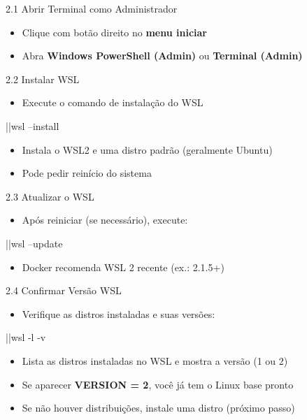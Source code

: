 \begin{frame}{2.1 Abrir Terminal como Administrador}
\begin{itemize}
  \item Clique com botão direito no \textbf{menu iniciar}
  \item Abra \textbf{Windows PowerShell (Admin)} ou \textbf{Terminal (Admin)}
\end{itemize}
\end{frame}

\begin{frame}[fragile]{2.2 Instalar WSL}
\begin{itemize}
  \item Execute o comando de instalação do WSL
\end{itemize}

\begin{bashprompt}
|\nocopy{\textdollar\ }|wsl --install
\end{bashprompt}

\begin{itemize}
  \item Instala o WSL2 e uma distro padrão (geralmente Ubuntu)
  \item Pode pedir reinício do sistema
\end{itemize}
\end{frame}

\begin{frame}[fragile]{2.3 Atualizar o WSL}
\begin{itemize}
  \item Após reiniciar (se necessário), execute:
\end{itemize}

\begin{bashprompt}
|\nocopy{\textdollar\ }|wsl --update
\end{bashprompt}

\begin{itemize}
  \item Docker recomenda WSL 2 recente (ex.: 2.1.5+)
\end{itemize}
\end{frame}

\begin{frame}[fragile]{2.4 Confirmar Versão WSL}
\begin{itemize}
  \item Verifique as distros instaladas e suas versões:
\end{itemize}

\begin{bashprompt}
|\nocopy{\textdollar\ }|wsl -l -v
\end{bashprompt}

\begin{itemize}
  \item Lista as distros instaladas no WSL e mostra a versão (1 ou 2)
  \item Se aparecer \textbf{VERSION = 2}, você já tem o Linux base pronto
  \item Se não houver distribuições, instale uma distro (próximo passo)
\end{itemize}
\end{frame}

